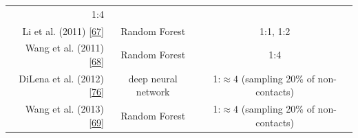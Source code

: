 \documentclass[11pt,a4paper,twoside]{book}
\theoremstyle{definition}
\theoremstyle{definition}
\theoremstyle{remark}
\begin{document}
\begin{longtable}[]{@{}rcc@{}}
\begin{minipage}[t]{0.29\columnwidth}
1:4\strut
\end{minipage}\tabularnewline
\begin{minipage}[t]{0.32\columnwidth}\raggedleft\strut
Li et al. (2011) {[}\protect\hyperlink{ref-Li2011}{67}{]}\strut
\end{minipage} & \begin{minipage}[t]{0.19\columnwidth}\centering\strut
Random Forest\strut
\end{minipage} & \begin{minipage}[t]{0.29\columnwidth}\centering\strut
1:1, 1:2\strut
\end{minipage}\tabularnewline
\begin{minipage}[t]{0.32\columnwidth}\raggedleft\strut
Wang et al. (2011) {[}\protect\hyperlink{ref-Wang2011}{68}{]}\strut
\end{minipage} & \begin{minipage}[t]{0.19\columnwidth}\centering\strut
Random Forest\strut
\end{minipage} & \begin{minipage}[t]{0.29\columnwidth}\centering\strut
1:4\strut
\end{minipage}\tabularnewline
\begin{minipage}[t]{0.32\columnwidth}\raggedleft\strut
DiLena et al. (2012) {[}\protect\hyperlink{ref-DiLena2012a}{76}{]}\strut
\end{minipage} & \begin{minipage}[t]{0.19\columnwidth}\centering\strut
deep neural network\strut
\end{minipage} & \begin{minipage}[t]{0.29\columnwidth}\centering\strut
1:\(\approx \!4\) (sampling 20\% of non-contacts)\strut
\end{minipage}\tabularnewline
\begin{minipage}[t]{0.32\columnwidth}\raggedleft\strut
Wang et al. (2013) {[}\protect\hyperlink{ref-Wang2013}{69}{]}\strut
\end{minipage} & \begin{minipage}[t]{0.19\columnwidth}\centering\strut
Random Forest\strut
\end{minipage} & \begin{minipage}[t]{0.29\columnwidth}\centering\strut
1:\(\approx 4\) (sampling 20\% of non-contacts)\strut
\end{minipage}\tabularnewline
\bottomrule
\end{longtable}
\end{document}
